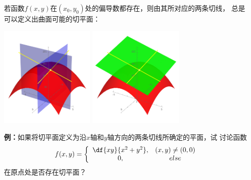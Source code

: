 若函数$f(x,y)$在$(x_0,y_0)$处的偏导数都存在，则由其所对应的两条切线，
总是可以定义出曲面可能的切平面：
\begin{center}
	\includegraphics[width=0.35\textwidth]{./images/ch9/pxy.pdf}\quad
	\includegraphics[width=0.35\textwidth]{./images/ch9/ppxy.pdf}
\end{center}

{\bf 例：}如果将切平面定义为沿$x$轴和$y$轴方向的两条切线所确定的平面，试
讨论函数
$$f(x,y)=\left\{\begin{array}{cc}
	\df{xy}{x^2+y^2},& (x,y)\ne (0,0)\\
	0, & else
\end{array}\right.$$
在原点处是否存在切平面？

